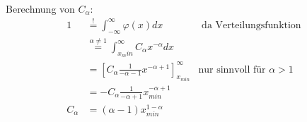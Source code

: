 \documentclass[10pt,a4paper]{scrartcl}
\begin{document}
Berechnung von $C_\alpha$:
\begin{align*}
    1 &\stackrel{!}{=} \int_{-\infty}^\infty \varphi(x) dx & \text{ da Verteilungsfunktion} \\
      &\stackrel{\alpha\neq 1}{=} \int_{x_min}^\infty C_\alpha x^{-\alpha} dx \\
      &= \left[C_\alpha \frac{1}{-\alpha-1} x^{-\alpha+1}\right]_{x_{min}}^\infty & \text{nur sinnvoll für } \alpha>1\\
      &= -C_\alpha \frac{1}{-\alpha+1}x_{min}^{-\alpha+1} \\
      C_\alpha &= (\alpha-1) x_{min}^{1-\alpha}
\end{align*}
\fi
\end{document}
